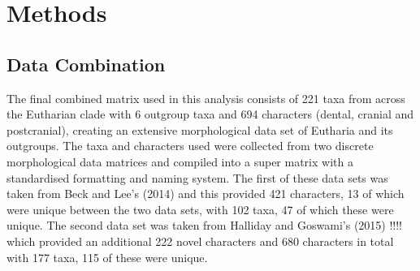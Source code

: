 \documentclass[11pt,letterpaper]{article}
\begin{document}

\newpage

\section{Methods}


\subsection{Data Combination}

The final combined matrix used in this analysis consists of 221 %
 taxa from across the Eutharian clade with 6 outgroup taxa %
and 694 characters (dental, cranial and postcranial), creating an extensive morphological data set of Eutharia and its outgroups.
The taxa and characters used were collected from two discrete morphological data matrices and compiled into a super matrix with a standardised formatting and naming system.
The first of these data sets was taken from Beck and Lee's (2014) and this provided 421 characters, 13 of which were unique between the two data sets, with 102 taxa, 47 of which these were unique.
The second data set was taken from Halliday and Goswami's (2015) !!!! which provided an additional 222 novel characters and 680 characters in total with 177 taxa, 115 of these were unique.
\end{document}
